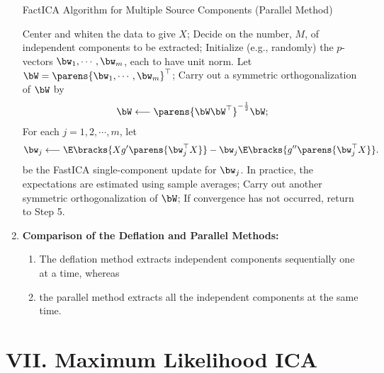 \documentclass[12pt]{article}
\begin{document}
\begin{enumerate}[label=\textbf{\arabic*.}]
	\begin{minipage}{\linewidth}
		\begin{algorithm}[H]
		\caption{FactICA Algorithm for Multiple Source Components (Parallel Method)}\label{algo-fastica-multiple-parallel}
		\begin{algorithmic}[1]
		\STATE Center and whiten the data to give $X$; 
		\STATE Decide on the number, $M$, of independent components to be extracted; 
		\STATE Initialize (e.g., randomly) the $p$-vectors $\bw_1, \cdots, \bw_m$, each to have unit norm. Let $\bW = \parens{\bw_1, \cdots, \bw_m}^\top$; 
		\STATE Carry out a symmetric orthogonalization of $\bW$ by 
		\begin{align*}
			\bW \longleftarrow \parens{\bW \bW^\top}^{-\frac{1}{2}} \bW; 
		\end{align*}
		\STATE For each $j = 1, 2, \cdots, m$, let 
		\begin{align*}
			\bw_j \longleftarrow \E \bracks{X g' \parens{\bw_{j}^\top X}} - \bw_j \E \bracks{ g'' \parens{\bw_{j}^\top X}}. 
		\end{align*}
		be the FastICA single-component update for $\bw_j$. In practice, the expectations are estimated using sample averages; 
		\STATE Carry out another symmetric orthogonalization of $\bW$; 
		\STATE If convergence has not occurred, return to Step 5. 
		\end{algorithmic}
		\end{algorithm}
	\end{minipage}
	
	\item \textbf{Comparison of the Deflation and Parallel Methods:} 
	\begin{enumerate}
		\item The deflation method extracts independent components sequentially one at a time, whereas 
		\item the parallel method extracts all the independent components at the same time.  
	\end{enumerate}
\end{enumerate}


\section*{VII. Maximum Likelihood ICA}
\end{document}
